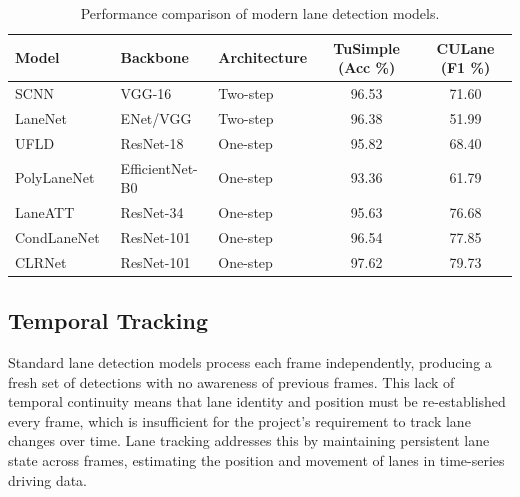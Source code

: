 \documentclass{article}
\begin{document}
\begin{table}[H]

\centering
    \begin{tabular}{l l l c c}
    \hline
    \textbf{Model} & \textbf{Backbone} & \textbf{Architecture} & \textbf{TuSimple (Acc \%)} & \textbf{CULane (F1 \%)} \\
    \hline
    SCNN~\cite{pan2018spatial} & VGG-16 & Two-step & 96.53 & 71.60 \\
    LaneNet~\cite{wang_lanenet_2018} & ENet/VGG & Two-step & 96.38 & 51.99 \\
    UFLD~\cite{qin2020ultra} & ResNet-18 & One-step & 95.82 & 68.40 \\
    PolyLaneNet~\cite{tabelini_polylanenet_2020} & EfficientNet-B0 & One-step & 93.36 & 61.79 \\
    LaneATT~\cite{tabelini2021keep} & ResNet-34 & One-step & 95.63 & 76.68 \\
    CondLaneNet~\cite{liu2021condlanenet} & ResNet-101 & One-step & 96.54 & 77.85 \\
    CLRNet~\cite{zheng2022clrnet} & ResNet-101 & One-step & 97.62 & 79.73 \\
    \hline
    \end{tabular}
    
    \caption{Performance comparison of modern lane detection models.}
    \label{tab:lane_model_comparison}

\end{table}

\subsection{Temporal Tracking}
Standard lane detection models process each frame independently, producing a fresh set of detections with no awareness of previous frames. This lack of temporal continuity means that lane identity and position must be re-established every frame, which is insufficient for the project's requirement to track lane changes over time. Lane tracking addresses this by maintaining persistent lane state across frames, estimating the position and movement of lanes in time-series driving data. 
\end{document}
